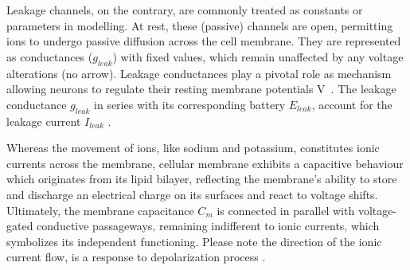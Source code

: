 \documentclass[class={myRUCProject}, crop=false]{standalone}
\begin{document}
Leakage channels, on the contrary, are commonly treated as constants or parameters in modelling. At rest, these (passive) channels are open, permitting ions to undergo passive diffusion across the cell membrane. They are represented as conductances ($g_{leak}$) with fixed values, which remain unaffected by any voltage alterations (no arrow). Leakage conductances play a pivotal role as mechanism allowing neurons to regulate their resting membrane potentials \unit{\V\membrane}. The leakage conductance $g_{leak}$ in series with its corresponding battery $E_{leak}$, account for the leakage current $I_{leak}$ \cite{kandel2000principles}. 

Whereas the movement of ions, like sodium and potassium, constitutes ionic currents across the membrane, cellular membrane exhibits a capacitive behaviour which originates from its lipid bilayer, reflecting the membrane's ability to store and discharge an electrical charge on its surfaces and react to voltage shifts. Ultimately, the membrane capacitance $C_{m}$ is connected in parallel with voltage-gated conductive passageways, remaining indifferent to ionic currents, which symbolizes its independent functioning. Please note the direction of the ionic current flow, is a response to depolarization process \cite{kandel2000principles}.


\end{document}

